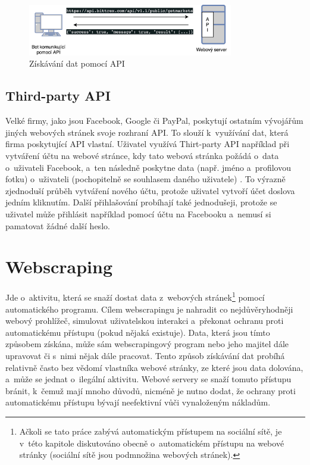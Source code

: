 \begin{figure}[hbt]
	\centering
	\includegraphics[width=0.8\textwidth]{images/API.jpg}
	\caption{Získávání dat pomocí API}
	\label{img:api}
\end{figure}

\subsection*{Third-party API}
Velké firmy, jako jsou Facebook, Google či PayPal, poskytují ostatním vývojářům jiných webových stránek svoje rozhraní API. To slouží k~využívání dat, která firma poskytující API vlastní. Uživatel využívá Thirt-party API například při vytváření účtu na webové stránce, kdy tato webová stránka požádá o~data o~uživateli Facebook, a~ten následně poskytne data (např. jméno a~profilovou fotku) o~uživateli (pochopitelně se souhlasem daného uživatele) \cite{bib:third_party_API}. To výrazně zjednoduší průběh vytváření nového účtu, protože uživatel vytvoří účet doslova jedním kliknutím. Další přihlašování probíhají také jednodušeji, protože se uživatel může přihlásit například pomocí účtu na Facebooku a~nemusí si pamatovat žádné další heslo.

\section{Webscraping}
\label{sec:webscraping}
Jde o~aktivitu, která se snaží dostat data z~webových stránek\footnote{Ačkoli se tato práce zabývá automatickým přístupem na sociální sítě, je v~této kapitole diskutováno obecně o~automatickém přístupu na webové stránky (sociální sítě jsou podmnožina webových stránek).} pomocí automatického programu. Cílem webscrapingu je nahradit co nejdůvěryhodněji webový prohlížeč, simulovat uživatelskou interakci a~překonat ochranu proti automatickému přístupu (pokud nějaká existuje). Data, která jsou tímto způsobem získána, může sám webscrapingový program nebo jeho majitel dále upravovat či s~nimi nějak dále pracovat. Tento způsob získávání dat probíhá relativně často bez vědomí vlastníka webové stránky, ze které jsou data dolována, a~může se jednat o~ilegální aktivitu. Webové servery se snaží tomuto přístupu bránit, k~čemuž mají mnoho důvodů, nicméně je nutno dodat, že ochrany proti automatickému přístupu bývají neefektivní vůči vynaloženým nákladům.

